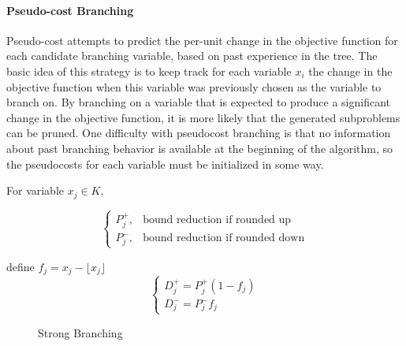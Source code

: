             \paragraph{Pseudo-cost Branching}               
                
                Pseudo-cost attempts to predict the per-unit change in the objective function for each candidate branching variable, based on past experience in the tree. The basic idea of this strategy is to keep track for each variable $x_i$ the change in the objective function when this variable was previously chosen as the variable to branch on. By branching on a variable that is expected to produce a significant change in the objective function, it is more likely that the generated subproblems can be pruned. One difficulty with pseudocost branching is that no information about past branching behavior is available at the beginning of the algorithm, so the pseudocosts for each variable must be initialized in some way.

                For variable $x_j\in K$, 
                
                \begin{equation*}\begin{cases}P_j^+, & \text{bound reduction if rounded up} \\ P_j^-, & \text{bound reduction if rounded down}\end{cases}\end{equation*}

                define $f_j = x_j -\lfloor x_j \rfloor$
                \begin{equation*}\begin{cases}D_j^+ = P_j^+ (1-f_j) \\ D_j^- = P_j^- f_j\end{cases}\end{equation*}

                \begin{figure}[H]
                    \centering
                    \caption{Strong Branching}
                \end{figure}

